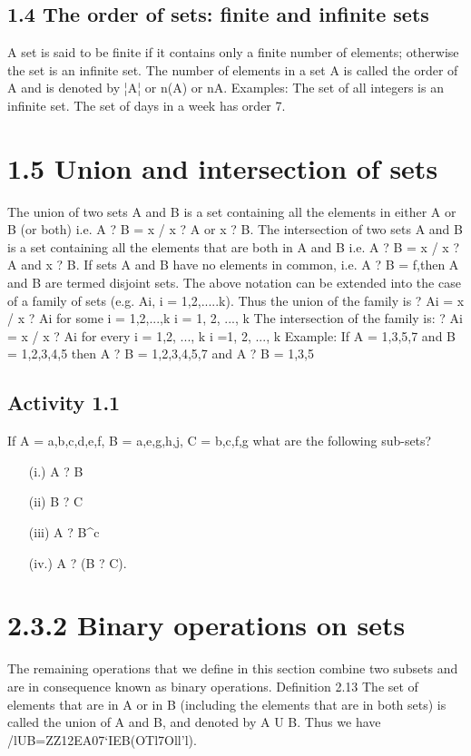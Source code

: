 {{%
\subsection{1.4 The order of sets: finite and infinite sets}
A set is said to be finite if it contains only a finite number of elements;
otherwise the set is an infinite set. The number of elements in a set A is
called the order of A and is denoted by ¦A¦ or n(A) or nA.
Examples:
The set of all integers is an infinite set.
The set of days in a week has order 7.

\section{1.5 Union and intersection of sets}
The union of two sets A and B is a set containing all the elements in
either A or B (or both)
i.e. A ? B = {x / x ? A or x ? B}.
The intersection of two sets A and B is a set containing all the elements
that are both in A and B
i.e. A ? B = {x / x ? A and x ? B}.
If sets A and B have no elements in common, i.e. A ? B = f,then A and B
are termed disjoint sets.
The above notation can be extended into the case of a family of sets (e.g.
Ai, i = 1,2,.....k). Thus the union of the family is
? Ai = {x / x ? Ai for some i = 1,2,...,k}
i = 1, 2, ..., k
The intersection of the family is:
? Ai = {x / x ? Ai for every i = 1,2, ..., k}
i =1, 2, ..., k
Example:
If A = {1,3,5,7} and B = {1,2,3,4,5} then A ? B = {1,2,3,4,5,7} and
A ? B = {1,3,5}
\subsection{Activity 1.1}
\smallskip If A = {a,b,c,d,e,f}, B = {a,e,g,h,j}, C = {b,c,f,g} what are the following sub-sets?
\begin{itemize}
\item[(i.)] A ? B
\item[(ii)] B ? C
\item[(iii)] A ? B^c
\item[(iv.)] A ? (B ? C).
\end{itemize}
\smallskip 
\section{2.3.2 Binary operations on sets}
The remaining operations that we deﬁne in this section combine two subsets and are in consequence
known as binary operations.
Deﬁnition 2.13 The set of elements that are in A or in B (including the elements that are in
both sets) is called the union of A and B, and denoted by A U B. Thus we have
/lUB={ZZ12EA07‘IEB(OTl7Oll'l)}.

}}
